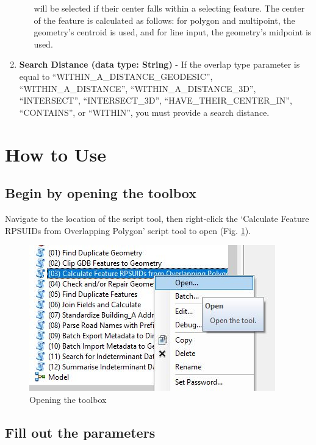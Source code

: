 \documentclass[openany]{book}
\theoremstyle{definition}
\theoremstyle{definition}
\theoremstyle{definition}
\theoremstyle{remark}
\begin{document}
\begin{enumerate}
\begin{itemize}
    will be selected if their center falls within a selecting feature.
    The center of the feature is calculated as follows: for polygon and
    multipoint, the geometry's centroid is used, and for line input, the
    geometry's midpoint is used.\\
  \end{itemize}
\item
  \textbf{Search Distance (data type: String)} - If the overlap type
  parameter is equal to ``WITHIN\_A\_DISTANCE\_GEODESIC'',
  ``WITHIN\_A\_DISTANCE'', ``WITHIN\_A\_DISTANCE\_3D'', ``INTERSECT'',
  ``INTERSECT\_3D'', ``HAVE\_THEIR\_CENTER\_IN'', ``CONTAINS'', or
  ``WITHIN'', you must provide a search distance.
\end{enumerate}

\section{How to Use}\label{how-to-use-2}

\subsection{Begin by opening the
toolbox}\label{begin-by-opening-the-toolbox-2}

Navigate to the location of the script tool, then right-click the
`Calculate Feature RPSUIDs from Overlapping Polygon' script tool to open
(Fig. \ref{fig:sjcopentool}).

\begin{figure}[H]

\hfill{}\includegraphics{figures/spatjoinCalcopentool} 

\caption{Opening the toolbox}\label{fig:sjcopentool}
\end{figure}

\subsection{Fill out the parameters}\label{fill-out-the-parameters-2}
\end{document}

